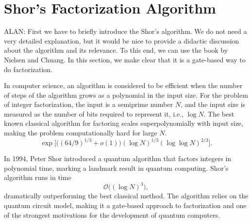 \section{Shor's Factorization Algorithm}

{\color{blue} ALAN: First we have to briefly introduce the Shor's algorithm. We do not need a
very detailed explanation, but it would be nice to provide a didactic discussion about the algorithm
and its relevance. To this end, we can use the book by Nielsen and Chuang. In this section,
we make clear that it is a gate-based way to do factorization.}

In computer science, an algorithm is considered to be efficient when the number of steps
of the algorithm grows as a polynomial in the input size. For the problem of integer factorization,
the input is a semiprime number $N$, and the input size is measured as the number of bits
required to represent it, i.e., $\log N$. The best known classical algorithm for factoring
scales superpolynomially with input size, making the problem computationally hard for large $N$.
\begin{equation}
    \exp \bigg[ \bigg( (64/9)^{1/3} + o(1) \bigg) (\log N)^{1/3} (\log \log N)^{2/3} \bigg].
    \label{field_sieve_scaling}
\end{equation}

In 1994, Peter Shor introduced a quantum algorithm that factors integers in polynomial time,
marking a landmark result in quantum computing. Shor's algorithm runs in time
\begin{equation}
    \mathcal{O} \big( (\log N)^3 \big),
    \label{shor_scaling}
\end{equation}
dramatically outperforming the best classical method. The algorithm relies on the quantum
circuit model, making it a gate-based approach to factorization and one of the strongest motivations
for the development of quantum computers.
